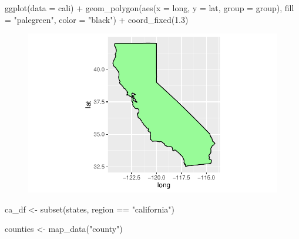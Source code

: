 \documentclass[
  letterpaper,
  DIV=11,
  numbers=noendperiod]{scrartcl}
\newenvironment{Shaded}{\begin{snugshade}}{\end{snugshade}}
\newcommand{\AttributeTok}[1]{\textcolor[rgb]{0.40,0.45,0.13}{#1}}
\newcommand{\FloatTok}[1]{\textcolor[rgb]{0.68,0.00,0.00}{#1}}
\newcommand{\FunctionTok}[1]{\textcolor[rgb]{0.28,0.35,0.67}{#1}}
\newcommand{\NormalTok}[1]{\textcolor[rgb]{0.00,0.23,0.31}{#1}}
\newcommand{\OtherTok}[1]{\textcolor[rgb]{0.00,0.23,0.31}{#1}}
\newcommand{\SpecialCharTok}[1]{\textcolor[rgb]{0.37,0.37,0.37}{#1}}
\newcommand{\StringTok}[1]{\textcolor[rgb]{0.13,0.47,0.30}{#1}}
\begin{document}
\begin{Shaded}
\begin{Highlighting}[]
\FunctionTok{ggplot}\NormalTok{(}\AttributeTok{data =}\NormalTok{ cali) }\SpecialCharTok{+} 
  \FunctionTok{geom\_polygon}\NormalTok{(}\FunctionTok{aes}\NormalTok{(}\AttributeTok{x =}\NormalTok{ long, }\AttributeTok{y =}\NormalTok{ lat, }\AttributeTok{group =}\NormalTok{ group), }\AttributeTok{fill =} \StringTok{"palegreen"}\NormalTok{, }\AttributeTok{color =} \StringTok{"black"}\NormalTok{) }\SpecialCharTok{+} 
  \FunctionTok{coord\_fixed}\NormalTok{(}\FloatTok{1.3}\NormalTok{)}
\end{Highlighting}
\end{Shaded}

\begin{figure}[H]

{\centering \includegraphics{Lab17_files/figure-pdf/unnamed-chunk-24-1.pdf}

}

\end{figure}

\begin{Shaded}
\begin{Highlighting}[]
\NormalTok{ca\_df }\OtherTok{\textless{}{-}} \FunctionTok{subset}\NormalTok{(states, region }\SpecialCharTok{==} \StringTok{"california"}\NormalTok{)}
\end{Highlighting}
\end{Shaded}

\begin{Shaded}
\begin{Highlighting}[]
\NormalTok{counties }\OtherTok{\textless{}{-}} \FunctionTok{map\_data}\NormalTok{(}\StringTok{"county"}\NormalTok{)}
\end{Highlighting}
\end{Shaded}
\end{document}
